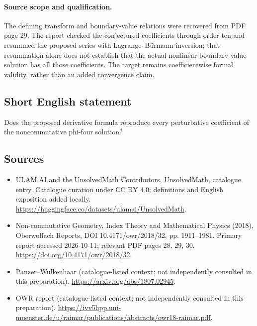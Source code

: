 \documentclass[11pt]{article}
\begin{document}
\paragraph{Source scope and qualification.}
The defining transform and boundary-value relations were recovered from PDF page 29. The report checked the conjectured coefficients through order ten and resummed the proposed series with Lagrange--B\"urmann inversion; that resummation alone does not establish that the actual nonlinear boundary-value solution has all those coefficients. The target remains coefficientwise formal validity, rather than an added convergence claim.
\subsection{Short English statement}
Does the proposed derivative formula reproduce every perturbative coefficient of the noncommutative phi-four solution?
\subsection{Sources}
\begin{itemize}
\item[\hypertarget{source:statement:1}{S1}] ULAM.AI and the UnsolvedMath Contributors, UnsolvedMath, catalogue entry. Catalogue curation under CC BY 4.0; definitions and English exposition added locally.
\url{https://huggingface.co/datasets/ulamai/UnsolvedMath}.
\item[\hypertarget{source:statement:2}{S2}] Non-commutative Geometry, Index Theory and Mathematical Physics (2018), Oberwolfach Reports, DOI 10.4171/owr/2018/32, pp. 1911--1981. Primary report accessed 2026-10-11; relevant PDF pages 28, 29, 30.
\url{https://doi.org/10.4171/owr/2018/32}.
\item[\hypertarget{source:statement:3}{S3}] Panzer--Wulkenhaar (catalogue-listed context; not independently consulted in this preparation).
\url{https://arxiv.org/abs/1807.02945}.
\item[\hypertarget{source:statement:4}{S4}] OWR report (catalogue-listed context; not independently consulted in this preparation).
\url{https://ivv5hpp.uni-muenster.de/u/raimar/publications/abstracts/owr18-raimar.pdf}.
\end{itemize}
\label{end:statement}
\end{document}
